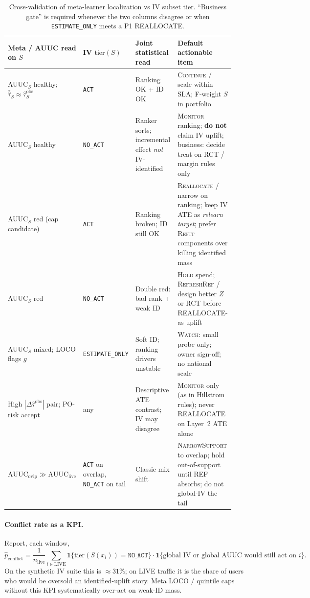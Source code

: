 \begin{table}[H]
\centering
\small
\caption{Cross-validation of meta-learner localization vs IV subset tier.
``Business gate'' is required whenever the two columns disagree or when
\texttt{ESTIMATE\_ONLY} meets a P1 REALLOCATE.}
\label{tab:cross-matrix}
\begin{tabular}{@{}p{0.22\linewidth}p{0.22\linewidth}p{0.24\linewidth}p{0.24\linewidth}@{}}
\toprule
Meta / AUUC read on $S$ & IV $\mathrm{tier}(S)$ & Joint statistical read & Default actionable item \\
\midrule
AUUC$_S$ healthy; $\bar{\hat\tau}_S\approx\widehat{\tau}^{\mathrm{obs}}_S$ &
\texttt{ACT} &
Ranking OK + ID OK &
\textsc{Continue} / scale within SLA; F-weight $S$ in portfolio \\
\addlinespace
AUUC$_S$ healthy &
\texttt{NO\_ACT} &
Ranker sorts; incremental effect \emph{not} IV-identified &
\textsc{Monitor} ranking; \textbf{do not} claim IV uplift; business: decide treat on RCT / margin rules only \\
\addlinespace
AUUC$_S$ red (cap candidate) &
\texttt{ACT} &
Ranking broken; ID still OK &
\textsc{Reallocate} / narrow on ranking; keep IV ATE as \emph{relearn target}; prefer \textsc{Refit} components over killing identified mass \\
\addlinespace
AUUC$_S$ red &
\texttt{NO\_ACT} &
Double red: bad rank + weak ID &
\textsc{Hold} spend; \textsc{RefreshRef} / design better $Z$ or RCT before REALLOCATE-as-uplift \\
\addlinespace
AUUC$_S$ mixed; LOCO flags $g$ &
\texttt{ESTIMATE\_ONLY} &
Soft ID; ranking drivers unstable &
\textsc{Watch}: small probe only; owner sign-off; no national scale \\
\addlinespace
High $|\Delta\widehat{\tau}^{\mathrm{obs}}|$ pair; PO-risk accept &
any &
Descriptive ATE contrast; IV may disagree &
\textsc{Monitor} only (as in Hillstrom rules); never REALLOCATE on Layer~2 ATE alone \\
\addlinespace
$\mathrm{AUUC}_{\mathrm{ovlp}}\gg\mathrm{AUUC}_{\mathrm{live}}$ &
\texttt{ACT} on overlap, \texttt{NO\_ACT} on tail &
Classic mix shift &
\textsc{NarrowSupport} to overlap; hold out-of-support until REF absorbs; do not global-IV the tail \\
\bottomrule
\end{tabular}
\end{table}

\paragraph{Conflict rate as a KPI.}
Report, each window,
\[
  \widehat{p}_{\mathrm{conflict}}
  =
  \frac{1}{n_{\mathrm{live}}}
  \sum_{i\in\mathrm{LIVE}}
  \mathbf{1}\{\mathrm{tier}(S(x_i))=\texttt{NO\_ACT}\}
  \cdot
  \mathbf{1}\{\text{global IV or global AUUC would still act on }i\}.
\]
On the synthetic IV suite this is $\approx 31\%$; on LIVE traffic it is the
share of users who would be oversold an identified-uplift story.
Meta LOCO / quintile caps without this KPI systematically over-act on
weak-ID mass.

